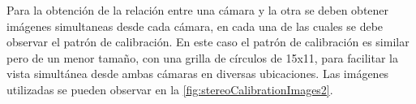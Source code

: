 Para la obtención de la relación entre una cámara y la otra se deben obtener imágenes simultaneas desde cada cámara, en cada una de las cuales se debe observar el patrón de calibración. En este caso el patrón de calibración es similar pero de un menor tamaño, con una grilla de círculos de 15x11, para facilitar la vista simultánea desde ambas cámaras en diversas ubicaciones. Las imágenes utilizadas se pueden observar en la \autoref{fig:stereoCalibrationImages2}.

\begin{figure}[!bth]
    \myfloatalign
       \\
\end{figure}
